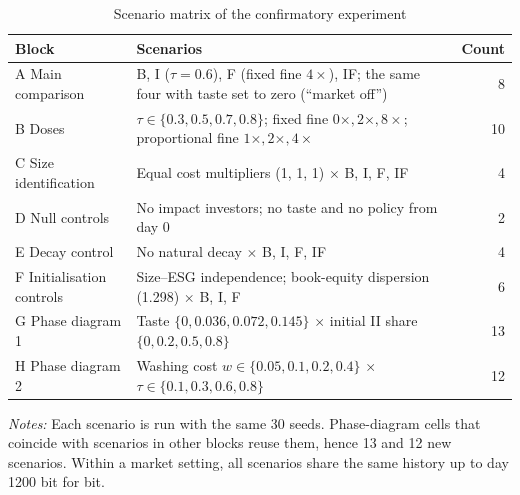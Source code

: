 \documentclass[11pt]{article}
\begin{document}
\begin{table}[t]
\centering
\small
\begin{threeparttable}
\caption{Scenario matrix of the confirmatory experiment}
\label{tab:matrix}
\begin{tabular}{@{}p{3.6cm}p{10.4cm}r@{}}
\toprule
Block & Scenarios & Count \\
\midrule
A Main comparison & B, I ($\tau=0.6$), F (fixed fine $4\times$), IF; the same four with taste set to zero (``market off'') & 8 \\
B Doses & $\tau \in \{0.3, 0.5, 0.7, 0.8\}$; fixed fine $0\times, 2\times, 8\times$; proportional fine $1\times, 2\times, 4\times$ & 10 \\
C Size identification & Equal cost multipliers (1, 1, 1) $\times$ B, I, F, IF & 4 \\
D Null controls & No impact investors; no taste and no policy from day 0 & 2 \\
E Decay control & No natural decay $\times$ B, I, F, IF & 4 \\
F Initialisation controls & Size--ESG independence; book-equity dispersion (1.298) $\times$ B, I, F & 6 \\
G Phase diagram 1 & Taste $\{0, 0.036, 0.072, 0.145\}$ $\times$ initial II share $\{0, 0.2, 0.5, 0.8\}$ & 13 \\
H Phase diagram 2 & Washing cost $w \in \{0.05, 0.1, 0.2, 0.4\}$ $\times$ $\tau \in \{0.1, 0.3, 0.6, 0.8\}$ & 12 \\
\bottomrule
\end{tabular}
\begin{tablenotes}[flushleft]\footnotesize
\item \textit{Notes:} Each scenario is run with the same 30 seeds. Phase-diagram cells that coincide with scenarios in other blocks reuse them, hence 13 and 12 new scenarios. Within a market setting, all scenarios share the same history up to day 1200 bit for bit.
\end{tablenotes}
\end{threeparttable}
\end{table}
\end{document}
